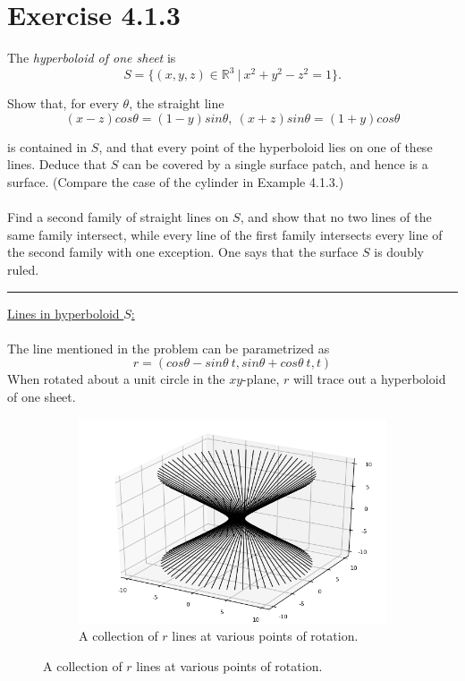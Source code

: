 \documentclass[12pt]{article}
\begin{document}
\maketitle

\section*{Exercise 4.1.3}

The \emph{hyperboloid of one sheet} is
$$
S = \lbrace \left( x,y,z \right) \in \mathbb{R}^3 \ \vert \ x^2 + y^2 - z^2 = 1  \rbrace.
$$

Show that, for every $\theta$, the straight line
$$
(x-z)cos\theta = (1-y)sin\theta,  \ (x+z)sin\theta = (1+y)cos\theta
$$

is contained in $S$, and that every point of the hyperboloid lies on one of these lines. Deduce that $S$ can be covered by a single surface patch, and hence is a surface. (Compare the case of the cylinder in Example 4.1.3.)
\\\\
\indent
Find a second family of straight lines on $S$, and show that no two lines of the same family intersect, while every line of the first family intersects every line of the second family with one exception. One says that the surface $S$ is doubly ruled.

\vspace{1cm}
\hrule
\vspace{1cm}

\noindent
\underline{Lines in hyperboloid $S$:}\\\\
\indent
The line mentioned in the problem can be parametrized as
$$
r = (cos\theta - sin\theta \ t, sin\theta + cos\theta \ t, t)
$$
\clearpage
When rotated about a unit circle in the $xy$-plane, $r$ will trace out a hyperboloid of one sheet.
\begin{figure}[h!]
  \centering
      \begin{subfigure}[b]{0.6\linewidth}
    \includegraphics[width=\linewidth]{./assets/4-1-3/hyperboloid-line-rotation.png}
    \caption*{A collection of $r$ lines at various points of rotation.}
  \end{subfigure}
  \end{figure}
\end{document}

